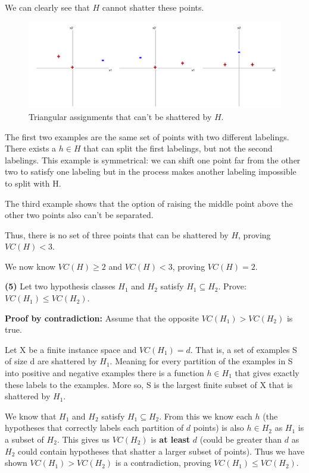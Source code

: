 \documentclass[11pt]{article}
\renewcommand\part[1]{\vspace{.10in}\textbf{(#1)}}
\begin{document}
We can clearly see that $H$ cannot shatter these points.

\begin{figure}[H]
  \centerline{\includegraphics[width=0.8\linewidth]{image_2_4_3.png}}
  \caption{Triangular assignments that can't be shattered by $H$.}
\end{figure}

The first two examples are the same set of points with two different labelings. There exists a $h \in H$ that can split the first labelings, but not the second labelings. This example is symmetrical: we can shift one point far from the other two to satisfy one labeling but in the process makes another labeling impossible to split with H.

The third example shows that the option of raising the middle point above the other two points also can't be separated.

Thus, there is no set of three points that can be shattered by $H$, proving $VC(H) < 3$.

We now know $VC(H) \geq 2$ and $VC(H) < 3$, proving $VC(H) = 2$.


\part{5} Let two hypothesis classes $H_1$ and $H_2$ satisfy $H_1 \subseteq H_2$. Prove: $VC(H_1) \leq VC(H_2)$.

\textbf{Proof by contradiction:} Assume that the opposite $VC(H_1) > VC(H_2)$ is true.

Let X be a finite instance space and $VC(H_1) = d$. That is, a set of examples S of size d are shattered by $H_1$. Meaning for every partition of the examples in S into positive and negative examples there is a function  $h \in H_1$ that gives exactly these labels to the examples. More so, S is the largest finite subset of X that is shattered by $H_1$.

We know that $H_1$ and $H_2$ satisfy $H_1 \subseteq H_2$. From this we know each $h$ (the hypotheses that correctly labels each partition of $d$ points) is also $h \in H_2$ as $H_1$ is a subset of $H_2$. This gives us $VC(H_2)$ is \textbf{at least} $d$ (could be greater than $d$ as $H_2$ could contain hypotheses that shatter a larger subset of points). Thus we have shown $VC(H_1) > VC(H_2)$ is a contradiction, proving $VC(H_1) \leq VC(H_2)$.
\end{document}
